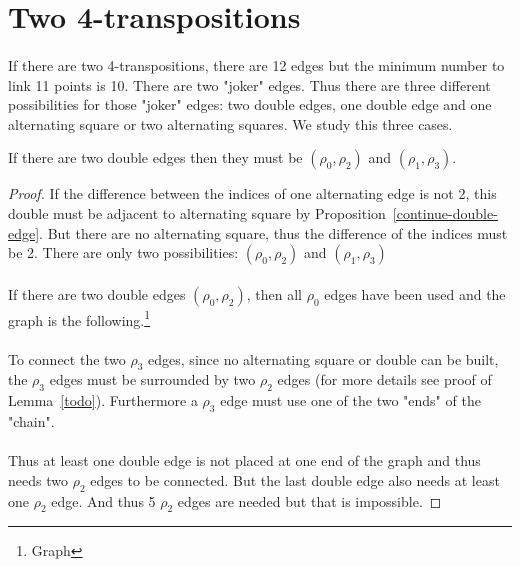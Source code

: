 \section{Two 4-transpositions}

\paragraph{}
If there are two 4-transpositions, there are 12 edges but the minimum number to link 11 points is 10. There are two "joker" edges. Thus there are three different possibilities for those "joker" edges: two double edges, one double edge and one alternating square or two alternating squares. We study this three cases.

\begin{lemma}
  If there are two double edges then they must be $(\rho_0, \rho_2)$ and $(\rho_1, \rho_3)$.
\end{lemma}

\begin{proof}
  If the difference between the indices of one alternating edge is not 2, this double must be adjacent to alternating square by Proposition~\ref{continue-double-edge}. But there are no alternating square, thus the difference of the indices must be 2. There are only two possibilities: $(\rho_0, \rho_2)$ and $(\rho_1, \rho_3)$

  \paragraph{}
  If there are two double edges $(\rho_0, \rho_2)$, then all $\rho_0$ edges have been used and the graph is the following.\footnote{Graph}

  \paragraph{}
  To connect the two $\rho_3$ edges, since no alternating square or double can be built, the $\rho_3$ edges must be surrounded by two $\rho_2$ edges (for more details see proof of Lemma~\ref{todo}). Furthermore a $\rho_3$ edge must use one of the two "ends" of the "chain".

  \paragraph{}
  Thus at least one double edge is not placed at one end of the graph and thus needs two $\rho_2$ edges to be connected. But the last double edge also needs at least one $\rho_2$ edge. And thus 5 $\rho_2$ edges are needed but that is impossible.

\end{proof}

